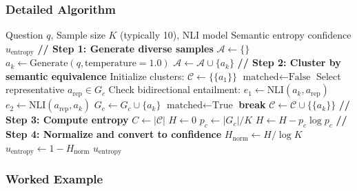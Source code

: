\documentclass[12pt,a4paper]{article}
\theoremstyle{definition}
\begin{document}
\subsubsection{Detailed Algorithm}

\begin{algorithm}[htbp]
\caption{Semantic Entropy Computation}
\begin{algorithmic}[1]
\Require Question $q$, Sample size $K$ (typically 10), NLI model
\Ensure Semantic entropy confidence $u_{\text{entropy}}$
\State
\State \textbf{// Step 1: Generate diverse samples}
\State $\mathcal{A} \gets \{\}$
    \State $a_k \gets \text{Generate}(q, \text{temperature}=1.0)$ 
    \State $\mathcal{A} \gets \mathcal{A} \cup \{a_k\}$
\EndFor
\State
\State \textbf{// Step 2: Cluster by semantic equivalence}
\State Initialize clusters: $\mathcal{C} \gets \{\{a_1\}\}$ 
    \State $\text{matched} \gets \text{False}$
        \State Select representative $a_{\text{rep}} \in G_c$
        \State Check bidirectional entailment:
        \State \quad $e_1 \gets \text{NLI}(a_k, a_{\text{rep}})$ 
        \State \quad $e_2 \gets \text{NLI}(a_{\text{rep}}, a_k)$ 
            \State $G_c \gets G_c \cup \{a_k\}$ 
            \State $\text{matched} \gets \text{True}$
            \State \textbf{break}
        \EndIf
    \EndFor
        \State $\mathcal{C} \gets \mathcal{C} \cup \{\{a_k\}\}$ 
    \EndIf
\EndFor
\State
\State \textbf{// Step 3: Compute entropy}
\State $C \gets |\mathcal{C}|$ 
\State $H \gets 0$
    \State $p_c \gets |G_c| / K$ 
    \State $H \gets H - p_c \log p_c$
\EndFor
\State
\State \textbf{// Step 4: Normalize and convert to confidence}
\State $H_{\text{norm}} \gets H / \log K$ 
\State $u_{\text{entropy}} \gets 1 - H_{\text{norm}}$ 
\State
\State \Return $u_{\text{entropy}}$
\end{algorithmic}
\end{algorithm}

\subsubsection{Worked Example}
\end{document}
